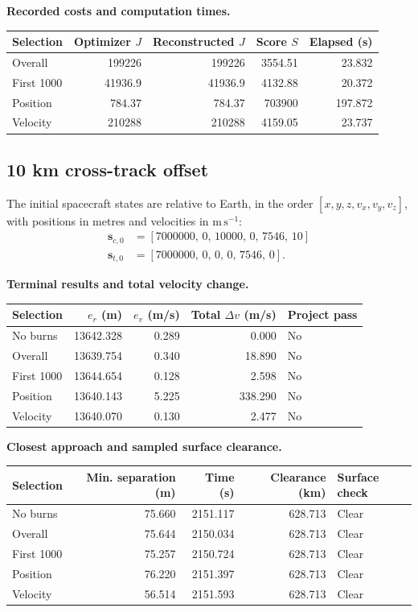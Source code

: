 \par\noindent\textbf{Recorded costs and computation times.}
\begin{center}
\begin{tabular}{lrrrr}
\toprule
Selection & Optimizer $J$ & Reconstructed $J$ & Score $S$ & Elapsed (s)\\
\midrule
Overall & 199226 & 199226 & 3554.51 & 23.832\\
First 1000 & 41936.9 & 41936.9 & 4132.88 & 20.372\\
Position & 784.37 & 784.37 & 703900 & 197.872\\
Velocity & 210288 & 210288 & 4159.05 & 23.737\\
\bottomrule
\end{tabular}
\end{center}
\clearpage
\subsection{10 km cross-track offset}
The initial spacecraft states are relative to Earth, in the order
$[x,y,z,v_x,v_y,v_z]$, with positions in metres and velocities in
$\mathrm{m\,s^{-1}}$:
\begin{align*}
\mathbf s_{c,0}&=[7000000,\,0,\,10000,\,0,\,7546,\,10]\\
\mathbf s_{t,0}&=[7000000,\,0,\,0,\,0,\,7546,\,0].
\end{align*}
\par\noindent\textbf{Terminal results and total velocity change.}
\begin{center}
\begin{tabular}{lrrrl}
\toprule
Selection & $e_r$ (m) & $e_v$ (m/s) & Total $\Delta v$ (m/s) & Project pass\\
\midrule
No burns & 13642.328 & 0.289 & 0.000 & No\\
Overall & 13639.754 & 0.340 & 18.890 & No\\
First 1000 & 13644.654 & 0.128 & 2.598 & No\\
Position & 13640.143 & 5.225 & 338.290 & No\\
Velocity & 13640.070 & 0.130 & 2.477 & No\\
\bottomrule
\end{tabular}
\end{center}
\par\noindent\textbf{Closest approach and sampled surface clearance.}
\begin{center}
\begin{tabular}{lrrrl}
\toprule
Selection & Min. separation (m) & Time (s) & Clearance (km) & Surface check\\
\midrule
No burns & 75.660 & 2151.117 & 628.713 & Clear\\
Overall & 75.644 & 2150.034 & 628.713 & Clear\\
First 1000 & 75.257 & 2150.724 & 628.713 & Clear\\
Position & 76.220 & 2151.397 & 628.713 & Clear\\
Velocity & 56.514 & 2151.593 & 628.713 & Clear\\
\bottomrule
\end{tabular}
\end{center}
